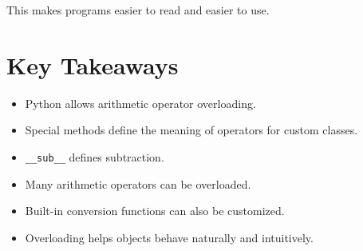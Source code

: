 \documentclass[11pt]{article}
\begin{document}
This makes programs easier to read and easier to use.

\section{Key Takeaways}

\begin{itemize}
    \item Python allows arithmetic operator overloading.
    \item Special methods define the meaning of operators for custom classes.
    \item \verb|__sub__| defines subtraction.
    \item Many arithmetic operators can be overloaded.
    \item Built-in conversion functions can also be customized.
    \item Overloading helps objects behave naturally and intuitively.
\end{itemize}
\end{document}
